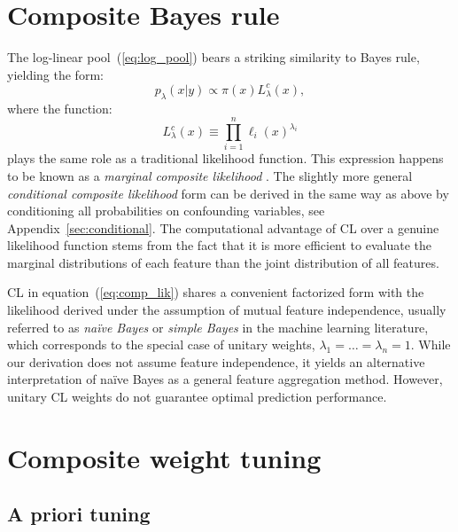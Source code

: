 \documentclass[english]{scrartcl}
\begin{document}



\section{Composite Bayes rule}
\label{sec:bayes_rule}

The log-linear pool~(\ref{eq:log_pool}) bears a striking similarity to Bayes rule, yielding  the form: 
$$
p_\lambda(x|y)\propto \pi(x) L^c_\lambda(x),
$$
where the function:
\begin{equation}
\label{eq:comp_lik}
L^c_\lambda(x) \equiv \prod_{i=1}^n \ell_i (x)^{\lambda_i}
\end{equation} 
plays the same role as a traditional likelihood function. This expression happens to be known as a {\em marginal composite likelihood} \cite{Varin-11}. The slightly more general {\em conditional composite likelihood} form can be derived in the same way as above by conditioning all probabilities on confounding variables, see Appendix~\ref{sec:conditional}. The computational advantage of CL over a genuine likelihood function stems from the fact that it is more efficient to evaluate the marginal distributions of each feature  than the joint distribution of all features.

CL in equation~(\ref{eq:comp_lik}) shares a convenient factorized form with the likelihood derived under the assumption of mutual feature independence, usually referred to as {\em na\"ive Bayes} or {\em simple Bayes} in the machine learning literature, which corresponds to the special case of unitary weights, $\lambda_1=\ldots=\lambda_n= 1$. While our derivation does not assume feature independence, it yields an alternative interpretation of na\"ive Bayes as a general feature aggregation method. However, unitary CL weights do not guarantee optimal prediction performance.


\section{Composite weight tuning}

\subsection{A priori tuning}
\end{document}
